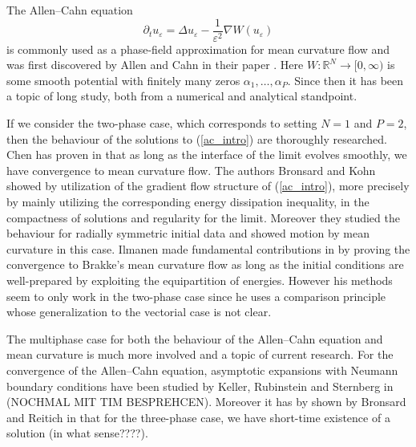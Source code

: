 The Allen--Cahn equation
\begin{equation}
	\label{ac_intro}
	\partial_{ t } u_{ \varepsilon }
	=
	\Delta u_{ \varepsilon }
	-
	\frac{ 1 }{ \varepsilon^{ 2 } }
	\nabla W ( u_{ \varepsilon } )
\end{equation}
is commonly used as a phase-field approximation for mean curvature flow and was 
first discovered by Allen and Cahn in their paper 
\cite{allen_cahn_microscopig_theory_for_antiphase_boundary_motion}. Here $ W 
\colon \mathbb{ R }^{ N } \to [ 0 , \infty ) $ is some smooth potential with 
finitely many zeros $ \alpha_{ 1 } , \dotsc, \alpha_{ P } $.
Since then it has been a topic of long study, both from a numerical and 
analytical standpoint. 

If we consider the two-phase case, which corresponds to setting $ N = 1 $ and $ 
P = 2 $, then 
the behaviour of the solutions to (\ref{ac_intro}) are thoroughly researched.
Chen has proven in 
\cite{chen_generation_and_propagation_of_interfaces_for_reaction_diffusion_equations}
that as long as the interface of the limit evolves smoothly, we have 
convergence to mean curvature flow.
The authors Bronsard and Kohn showed by utilization of the gradient flow 
structure of (\ref{ac_intro}), more precisely by mainly utilizing the 
corresponding energy dissipation inequality, in 
\cite{bronsard_kohn_motion_by_mean_curvature_as_singular_limit} the compactness 
of solutions and regularity for the limit. Moreover they studied the behaviour 
for radially symmetric initial data and showed motion by mean curvature in this 
case. 
Ilmanen made fundamental contributions in 
\cite{ilmanen_convergence_of_ac_to_brakkes_mcf} by proving the convergence to 
Brakke's mean curvature flow as long as the initial conditions are 
well-prepared by exploiting the equipartition of energies. However his methods 
seem to only work in the two-phase case since he uses a comparison principle 
whose generalization to the vectorial case is not clear.

The multiphase case for both the behaviour of the Allen--Cahn equation and mean 
curvature is much more involved and a topic of current research. For the 
convergence of the Allen--Cahn equation, asymptotic expansions  with Neumann 
boundary conditions 
have been studied by Keller, Rubinstein and Sternberg in 
\cite{keller_rubinstein_sternberg_fast_reaction_slow_diffusion} (NOCHMAL MIT 
TIM BESPREHCEN). Moreover it has by shown by Bronsard and 
Reitich in 
\cite{bronsard_reitich_on_three_phase_boundary_motion_and_singular_limit} that 
for the three-phase case, we have short-time existence of a solution (in what 
sense????). 

